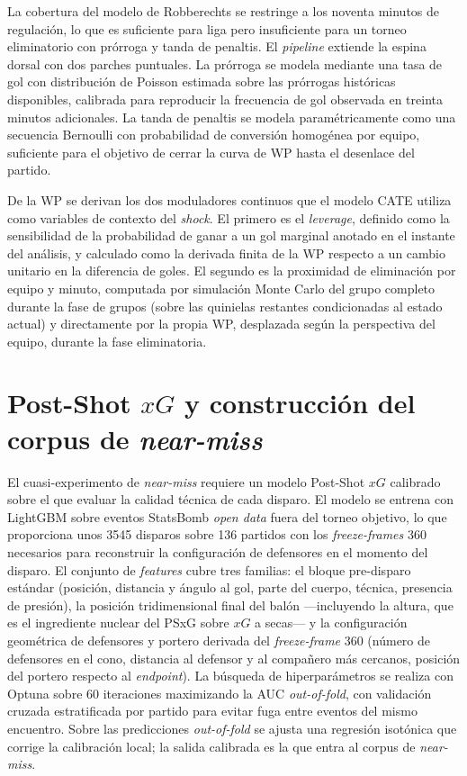 La cobertura del modelo de Robberechts se restringe a los noventa
minutos de regulación, lo que es suficiente para liga pero insuficiente
para un torneo eliminatorio con prórroga y tanda de penaltis. El
\textit{pipeline} extiende la espina dorsal con dos parches
puntuales. La prórroga se modela mediante una tasa de gol con
distribución de Poisson estimada sobre las prórrogas históricas
disponibles, calibrada para reproducir la frecuencia de gol observada
en treinta minutos adicionales. La tanda de penaltis se modela
paramétricamente como una secuencia Bernoulli con probabilidad de
conversión homogénea por equipo, suficiente para el objetivo de cerrar
la curva de WP hasta el desenlace del partido.

De la WP se derivan los dos moduladores continuos que el modelo CATE
utiliza como variables de contexto del \textit{shock}. El primero es
el \textit{leverage}, definido como la sensibilidad de la probabilidad
de ganar a un gol marginal anotado en el instante del análisis, y
calculado como la derivada finita de la WP respecto a un cambio
unitario en la diferencia de goles. El segundo es la proximidad de
eliminación por equipo y minuto, computada por simulación Monte Carlo
del grupo completo durante la fase de grupos (sobre las quinielas
restantes condicionadas al estado actual) y directamente por la
propia WP, desplazada según la perspectiva del equipo, durante la
fase eliminatoria.


\section{Post-Shot $xG$ y construcción del corpus de \textit{near-miss}}
\label{sec:psxg-nearmiss}

El cuasi-experimento de \textit{near-miss} requiere un modelo Post-Shot
$xG$ calibrado sobre el que evaluar la calidad técnica de cada
disparo. El modelo se entrena con LightGBM sobre eventos StatsBomb
\textit{open data} fuera del torneo objetivo, lo que proporciona unos
3545 disparos sobre 136 partidos con los \textit{freeze-frames} 360
necesarios para reconstruir la configuración de defensores en el
momento del disparo. El conjunto de \textit{features} cubre tres
familias: el bloque pre-disparo estándar (posición, distancia y
ángulo al gol, parte del cuerpo, técnica, presencia de presión), la
posición tridimensional final del balón ---incluyendo la altura, que
es el ingrediente nuclear del PSxG sobre $xG$ a secas--- y la
configuración geométrica de defensores y portero derivada del
\textit{freeze-frame} 360 (número de defensores en el cono, distancia
al defensor y al compañero más cercanos, posición del portero
respecto al \textit{endpoint}). La búsqueda de hiperparámetros se
realiza con Optuna sobre 60 iteraciones maximizando la AUC
\textit{out-of-fold}, con validación cruzada estratificada por
partido para evitar fuga entre eventos del mismo encuentro. Sobre
las predicciones \textit{out-of-fold} se ajusta una regresión
isotónica que corrige la calibración local; la salida calibrada es
la que entra al corpus de \textit{near-miss}.

